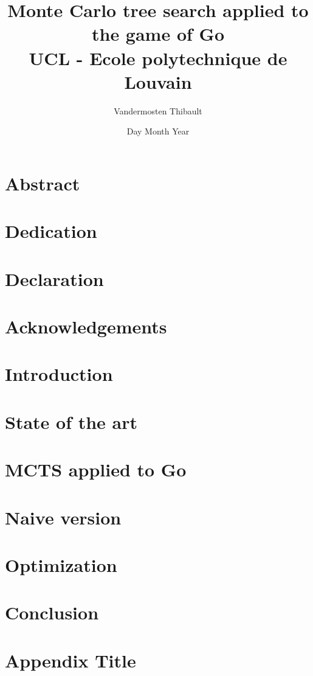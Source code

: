 \documentclass[12pt]{report}
\title{
	{Monte Carlo tree search applied to the game of Go}\\
	{\large UCL - Ecole polytechnique de Louvain}\\
}
\author{Vandermosten Thibault}
\date{Day Month Year}
\begin{document}
\maketitle


\chapter*{Abstract}

\chapter*{Dedication}

\chapter*{Declaration}

\chapter*{Acknowledgements}

\tableofcontents

\chapter{Introduction}


\chapter{State of the art}


\chapter{MCTS applied to Go}


\chapter{Naive version}


\chapter{Optimization}



\chapter{Conclusion}
%

\appendix
\chapter{Appendix Title}
%
\end{document}
